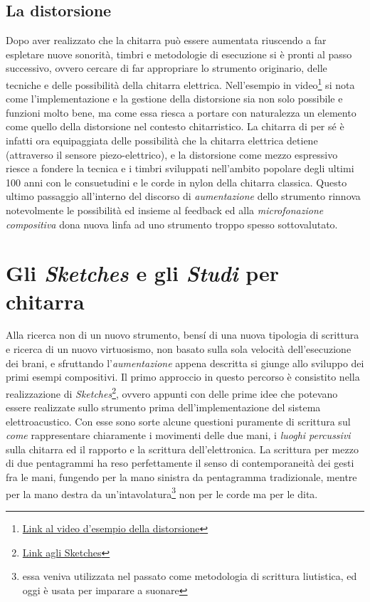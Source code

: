 \documentclass[oneside]{article}
\begin{document}
\begin{multicols*}{2}
\subsection{La distorsione} 
Dopo aver realizzato che la chitarra può essere aumentata riuscendo a far espletare nuove sonorità, timbri e metodologie di esecuzione si è pronti al passo successivo, ovvero cercare di far appropriare lo strumento originario, delle tecniche e delle possibilità della chitarra elettrica. Nell'esempio in video\footnote{\href{https://www.youtube.com/watch?v=K3yqyxcJStg}{Link al video d'esempio della distorsione}} si nota come l'implementazione e la gestione della distorsione sia non solo possibile e funzioni molto bene, ma come essa riesca a portare con naturalezza un elemento come quello della distorsione nel contesto chitarristico. La chitarra di per sé è infatti ora equipaggiata delle possibilità che la chitarra elettrica detiene (attraverso il sensore piezo-elettrico), e la distorsione come mezzo espressivo riesce a fondere la tecnica e i timbri sviluppati nell'ambito popolare degli ultimi 100 anni con le consuetudini e le corde in nylon della chitarra classica. Questo ultimo passaggio all'interno del discorso di \textit{aumentazione} dello strumento rinnova notevolmente le possibilità ed insieme al feedback ed alla \textit{microfonazione compositiva} dona nuova linfa ad uno strumento troppo spesso sottovalutato.


\section{ Gli \textit{Sketches} e gli \textit{Studi} per chitarra}
\noindent

Alla ricerca non di un nuovo strumento, bensí di una nuova tipologia di scrittura e ricerca di un nuovo virtuosismo, non basato sulla sola velocità dell’esecuzione dei brani, e  sfruttando l'\textit{aumentazione} appena descritta si giunge allo sviluppo dei primi esempi compositivi.
Il primo approccio in questo percorso è consistito nella realizzazione di \textit{Sketches}\footnote{\href{https://github.com/SMERM/BN-Tedesco/blob/master/COME-02/Lezioni_in_Compresenza/20200324/Sketches.pdf}{Link agli Sketches}}, ovvero appunti con delle prime idee che potevano essere realizzate sullo strumento prima dell'implementazione del sistema elettroacustico. Con esse sono sorte alcune questioni puramente di scrittura sul \textit{come} rappresentare chiaramente i movimenti delle due mani, i \textit{luoghi percussivi} sulla chitarra ed il rapporto e la scrittura dell'elettronica.
La scrittura per mezzo di due pentagrammi ha reso perfettamente il senso di contemporaneità dei gesti fra le mani, fungendo per la mano sinistra da pentagramma tradizionale, mentre per la mano destra da un'intavolatura\footnote{essa veniva utilizzata nel passato come metodologia di scrittura liutistica, ed oggi è usata per imparare a suonare} non per le corde ma per le dita. 


\end{multicols*}
\end{document}
